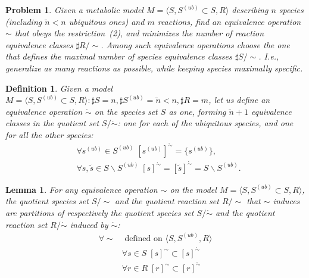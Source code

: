 \documentclass[10pt]{bmc_article}
\newenvironment{bmcformat}{\baselineskip20pt\sloppy\setboolean{publ}{false}}{\baselineskip20pt\sloppy}
\begin{document}
\begin{bmcformat}
\newtheorem{p0}{Problem}
\begin{p0}
Given a metabolic model $M=\langle S, S^{(ub)} \subset S, R \rangle$ describing $n$ species (including $\breve{n} < n$ ubiquitous ones) and $m$ reactions, find an equivalence operation $\sim$ that obeys the restriction~(2), and minimizes the number of reaction equivalence classes $\sharp R/\sim$. Among such equivalence operations choose the one that defines the maximal number of species equivalence classes $\sharp S/\sim$. I.e., generalize as many reactions as possible, while keeping species maximally specific.
\end{p0}
\newtheorem{eq0}{Definition}
\begin{eq0}
Given a model $M=\langle S, S^{(ub)}\subset{S}, R \rangle : \sharp S = n, \sharp S^{(ub)}=\breve{n} < n, \sharp R = m$, let us define an equivalence operation $\mathring{\sim}$ on the species set $S$ as one, forming $\breve{n} + 1$ equivalence classes in the quotient set $S/\mathring{\sim}$: one for each of the ubiquitous species, and one for all the other species:
\begin{align*}
&\forall s^{(ub)} \in S^{(ub)} \;[s^{(ub)}]^{\mathring{\sim}} = \{s^{(ub)}\}, \\
&\forall s, \tilde{s} \in S\backslash S^{(ub)} \;[s]^{\mathring{\sim} } = [\tilde{s}]^{\mathring{\sim} } = S \backslash S^{(ub)}.
\end{align*}
\end{eq0}
\newtheorem{l1}{Lemma}
\begin{l1}
For any equivalence operation $\sim$ on the model $M=\langle S, S^{(ub)} \subset S, R \rangle$, the quotient species set $S/\sim$ and the quotient reaction set $R/\sim$ that $\sim$ induces are partitions of respectively the quotient species set $S/\mathring{\sim}$ and the quotient reaction set $R/\mathring{\sim} $ induced by $\mathring{\sim}$:
\begin{align*}
\forall \sim &\text{ defined on }\langle S, S^{(ub)}, R \rangle\\
&\forall s \in S \; [s]^{\sim} \subset [s]^{\mathring{\sim}} \\
&\forall r \in R \; [r]^{\sim} \subset [r]^{\mathring{\sim}} 
\end{align*}
\end{l1}


\end{bmcformat}
\end{document}
